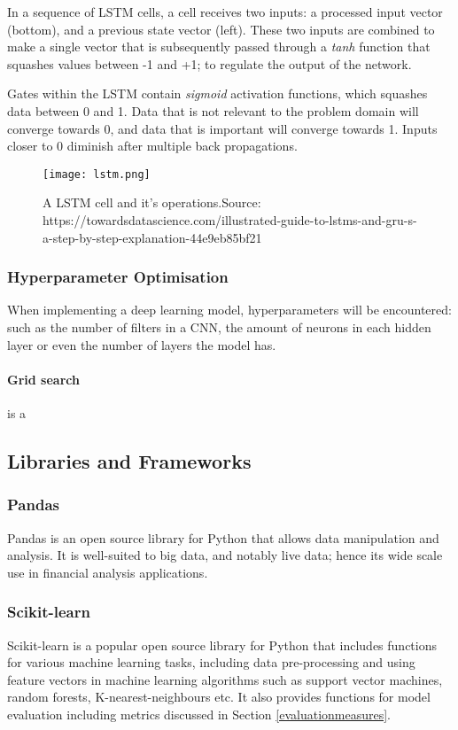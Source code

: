 \documentclass[11pt]{article}
\begin{document}
In a sequence of LSTM cells, a cell receives two inputs: a processed input vector (bottom), and a previous state vector (left). These two inputs are combined to make a single vector that is subsequently passed through a \textit{tanh} function that squashes values between -1 and +1; to regulate the output of the network.  

Gates within the LSTM contain \textit{sigmoid} activation functions, which squashes data between 0 and 1. Data that is not relevant to the problem domain will converge towards 0, and data that is important will converge towards 1. Inputs closer to 0 diminish after multiple back propagations. 


\begin{figure}[h!]
\centering
\texttt{[image: lstm.png]}
\caption{A LSTM cell and it's operations.\newline Source: https://towardsdatascience.com/illustrated-guide-to-lstms-and-gru-s-a-step-by-step-explanation-44e9eb85bf21}
\label{fig:lstm}
\end{figure}

\subsubsection{Hyperparameter Optimisation}
When implementing a deep learning model, hyperparameters will be encountered: such as the number of filters in a CNN, the amount of neurons in each hidden layer or even the number of layers the model has. \\
\paragraph{Grid search} is a 
\subsection{Libraries and Frameworks}
\subsubsection{Pandas}
Pandas is an open source library for Python that allows data manipulation and analysis. It is  well-suited to big data, and notably live data; hence its wide scale use in financial analysis applications.   
\subsubsection{Scikit-learn}
Scikit-learn is a popular open source library for Python that includes functions for various machine learning tasks, including data pre-processing and using feature vectors in machine learning algorithms such as support vector machines, random forests, K-nearest-neighbours etc. 
It also provides functions for model evaluation including metrics discussed in Section \ref{evaluationmeasures}.
  
\end{document}
